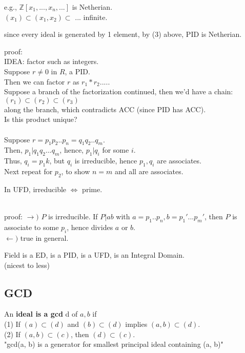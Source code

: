 \documentclass[12pt]{article}
\begin{document}
e.g., $\mathbb{Z}[x_1, ..., x_n, ...]$ is Netherian. \\
\textcolor[gray]{0.5}{$(x_1) \subset (x_1, x_2) \subset$ ... infinite.}

\centerline{}
\textcolor[gray]{0.5}{since every ideal is generated by 1 element, by (3) above, PID is Netherian.}


\textcolor[gray]{0.5}{proof: \\
IDEA: factor such as integers. \\
Suppose $r \neq 0$ in $R$, a PID.\\
Then we can factor $r$ as $r_1*r_2....$. \\
Suppose a branch of the factorization continued, then we'd have a chain: \\
$(r_1) \subset (r_2) \subset (r_3)$\\
along the branch, which contradicts ACC (since PID has ACC).\\
Is this product unique?\\
\ \\
Suppose $r = p_1 p_2 ..p_n = q_1 q_2 ..q_m$. \\
Then, $p_1 | q_1 q_2 ... q_m$, hence, $p_1 | q_i$ for some $i$.\\
Thus, $q_i = p_1 k$, but $q_i$ is irreducible, hence $p_1, q_i$ are associates.\\
Next repeat for $p_2$, to show $n=m$ and all are associates.
}

\centerline{In UFD, irreducible $\iff$ prime.} \\
\textcolor[gray]{0.5}{proof: 
$\rightarrow)$ $P$ is irreducible.
If $P |ab$ with $a = p_1 .. p_n, b = p_1'...p_m'$, then $P$ is associate to some $p_i$, hence divides $a$ or $b$. \\
$\leftarrow)$ true in general.}

Field is a ED, is a PID, is a UFD, is an Integral Domain.\\
(nicest to less)\\

\subsection*{GCD}

An \textbf{ideal is a gcd} d of $a, b$ if \\
(1) If $(a) \subset (d)$ and $(b) \subset (d)$ implies $(a, b) \subset (d)$.\\
(2) If $(a, b) \subset (c)$, then $(d) \subset (c)$.\\
"gcd(a, b) is a generator for smallest principal ideal containing (a, b)"\\
\end{document}
